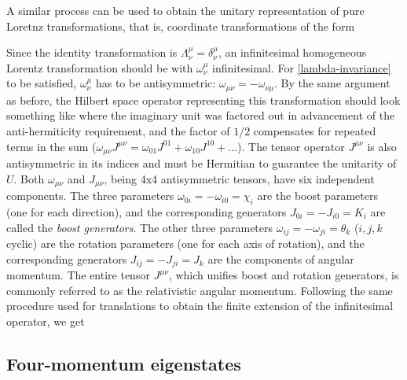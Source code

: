 \documentclass[12pt,a4paper,notitlepage]{report}
\begin{document}
A similar process can be used to obtain the unitary representation of pure Loretnz transformations, that is, coordinate transformations of the form

%
Since the identity transformation is $\Lambda^\mu_\nu = \delta^\mu_\nu$, an infinitesimal homogeneous Lorentz transformation should be
%
\eq{ \Lambda^\mu_\nu = \delta^\mu_\nu + \omega^\mu_\nu ,
}
%
with $\omega^\mu_\nu$ infinitesimal. For \eqref{lambda-invariance} to be satisfied, $\omega^\mu_\nu$ has to be antisymmetric: $\omega_{\mu\nu} = - \omega_{\nu\mu}$. By the same argument as before, the Hilbert space operator representing this transformation should look something like
%
%
where the imaginary unit was factored out in advancement of the anti-hermiticity requirement, and the factor of $1/2$ compensates for repeated terms in the sum ($\omega_{\mu\nu}J^{\mu\nu} =  \omega_{01}J^{01} + \omega_{10}J^{10} + ...$). The tensor operator $J^{\mu\nu}$ is also antisymmetric in its indices and must be Hermitian to guarantee the unitarity of $U$. Both $\omega_{\mu\nu}$ and $J_{\mu\nu}$, being 4x4 antisymmetric tensors, have six independent components. The three parameters $\omega_{0 i} = - \omega_{i 0} = \chi_i$ are the boost parameters (one for each direction), and the corresponding generators $J_{0 i} = - J_{i 0} = K_i$ are called the {\it boost generators}. The other three parameters $\omega_{i j} = -\omega_{j i} = \theta_k$ ($i,j,k$ cyclic) are the rotation parameters (one for each axis of rotation), and the corresponding generators $J_{i j} = -J_{j i} = J_k$ are the components of angular momentum. The entire tensor $J^{\mu\nu}$, which unifies boost and rotation generators, is commonly referred to as the relativistic angular momentum. Following the same procedure used for translations to obtain the finite extension of the infinitesimal operator, we get
%


\subsection{Four-momentum eigenstates}
\label{four-momentum-eigenstates}
\end{document}
